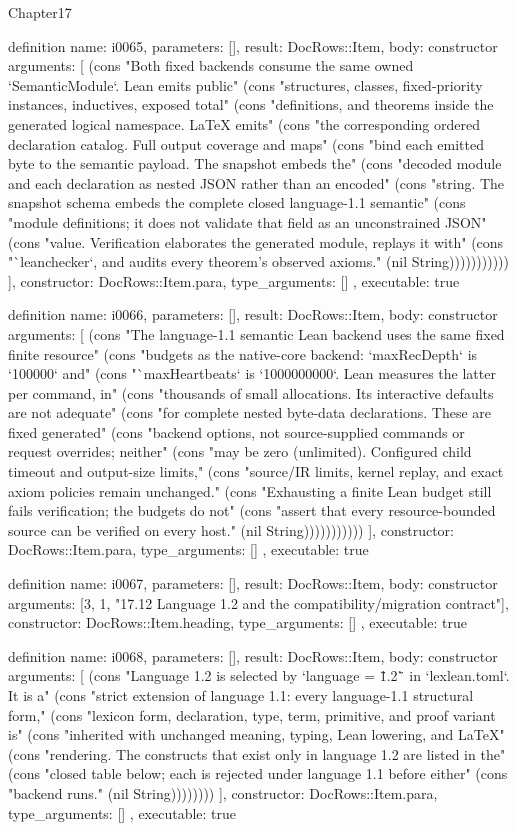 \begin{lexlean}{Chapter17}
\begin{semanticmodule}
definition{
  name: i0065,
  parameters: [],
  result: DocRows::Item,
  body: constructor{
    arguments: [
      (cons "Both fixed backends consume the same owned `SemanticModule`. Lean emits public" (cons "structures, classes, fixed-priority instances, inductives, exposed total" (cons "definitions, and theorems inside the generated logical namespace. LaTeX emits" (cons "the corresponding ordered declaration catalog. Full output coverage and maps" (cons "bind each emitted byte to the semantic payload. The snapshot embeds the" (cons "decoded module and each declaration as nested JSON rather than an encoded" (cons "string. The snapshot schema embeds the complete closed language-1.1 semantic" (cons "module definitions; it does not validate that field as an unconstrained JSON" (cons "value. Verification elaborates the generated module, replays it with" (cons "`leanchecker`, and audits every theorem's observed axioms." (nil String)))))))))))
    ],
    constructor: DocRows::Item.para,
    type_arguments: []
  },
  executable: true
}

definition{
  name: i0066,
  parameters: [],
  result: DocRows::Item,
  body: constructor{
    arguments: [
      (cons "The language-1.1 semantic Lean backend uses the same fixed finite resource" (cons "budgets as the native-core backend: `maxRecDepth` is `100000` and" (cons "`maxHeartbeats` is `1000000000`. Lean measures the latter per command, in" (cons "thousands of small allocations. Its interactive defaults are not adequate" (cons "for complete nested byte-data declarations. These are fixed generated" (cons "backend options, not source-supplied commands or request overrides; neither" (cons "may be zero (unlimited). Configured child timeout and output-size limits," (cons "source/IR limits, kernel replay, and exact axiom policies remain unchanged." (cons "Exhausting a finite Lean budget still fails verification; the budgets do not" (cons "assert that every resource-bounded source can be verified on every host." (nil String)))))))))))
    ],
    constructor: DocRows::Item.para,
    type_arguments: []
  },
  executable: true
}

definition{
  name: i0067,
  parameters: [],
  result: DocRows::Item,
  body: constructor{
    arguments: [3, 1, "17.12 Language 1.2 and the compatibility/migration contract"],
    constructor: DocRows::Item.heading,
    type_arguments: []
  },
  executable: true
}

definition{
  name: i0068,
  parameters: [],
  result: DocRows::Item,
  body: constructor{
    arguments: [
      (cons "Language 1.2 is selected by `language = \"1.2\"` in `lexlean.toml`. It is a" (cons "strict extension of language 1.1: every language-1.1 structural form," (cons "lexicon form, declaration, type, term, primitive, and proof variant is" (cons "inherited with unchanged meaning, typing, Lean lowering, and LaTeX" (cons "rendering. The constructs that exist only in language 1.2 are listed in the" (cons "closed table below; each is rejected under language 1.1 before either" (cons "backend runs." (nil String))))))))
    ],
    constructor: DocRows::Item.para,
    type_arguments: []
  },
  executable: true
}


\end{semanticmodule}
\end{lexlean}
